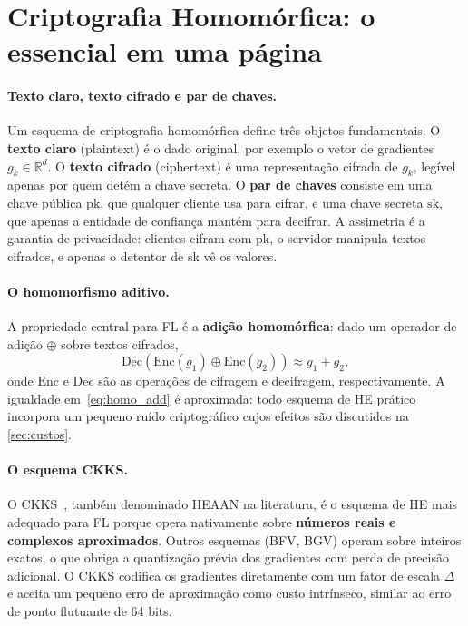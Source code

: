 \documentclass[11pt,a4paper]{article}
\begin{document}
\section{Criptografia Homomórfica: o essencial em uma página}
\label{sec:he_basico}

\paragraph{Texto claro, texto cifrado e par de chaves.}
Um esquema de criptografia homomórfica define três objetos fundamentais. O
\textbf{texto claro} (plaintext) é o dado original, por exemplo o vetor de
gradientes $g_k \in \mathbb{R}^d$. O \textbf{texto cifrado} (ciphertext) é uma
representação cifrada de $g_k$, legível apenas por quem detém a chave secreta. O
\textbf{par de chaves} consiste em uma chave pública $\text{pk}$, que qualquer
cliente usa para cifrar, e uma chave secreta $\text{sk}$, que apenas a entidade de
confiança mantém para decifrar. A assimetria é a garantia de privacidade: clientes
cifram com $\text{pk}$, o servidor manipula textos cifrados, e apenas o detentor de
$\text{sk}$ vê os valores.

\paragraph{O homomorfismo aditivo.}
A propriedade central para FL é a \textbf{adição homomórfica}: dado um operador de
adição $\oplus$ sobre textos cifrados,
\begin{equation}
  \mathrm{Dec}\!\left(\mathrm{Enc}(g_1) \oplus \mathrm{Enc}(g_2)\right)
  \approx g_1 + g_2,
  \label{eq:homo_add}
\end{equation}
onde $\mathrm{Enc}$ e $\mathrm{Dec}$ são as operações de cifragem e decifragem,
respectivamente. A igualdade em~\eqref{eq:homo_add} é aproximada: todo esquema de
HE prático incorpora um pequeno ruído criptográfico cujos efeitos são discutidos na
\cref{sec:custos}.

\paragraph{O esquema CKKS.}
O CKKS~\cite{Cheon2017}, também denominado HEAAN na literatura, é o esquema de HE
mais adequado para FL porque opera nativamente sobre \textbf{números reais e complexos
aproximados}. Outros esquemas (BFV, BGV) operam sobre inteiros exatos, o que obriga
a quantização prévia dos gradientes com perda de precisão adicional. O CKKS codifica
os gradientes diretamente com um fator de escala $\Delta$ e aceita um pequeno erro de
aproximação como custo intrínseco, similar ao erro de ponto flutuante de 64 bits.
\end{document}

